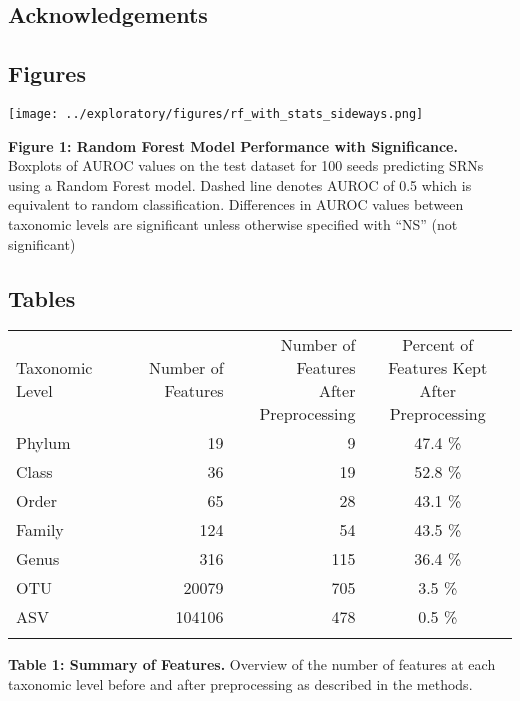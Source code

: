 \documentclass[
]{article}
\begin{document}
\hypertarget{acknowledgements}{%
\subsection{Acknowledgements}\label{acknowledgements}}

\newpage

\hypertarget{figures}{%
\subsection{Figures}\label{figures}}

\texttt{[image: ../exploratory/figures/rf\_with\_stats\_sideways.png]}

\textbf{Figure 1: Random Forest Model Performance with Significance.}
Boxplots of AUROC values on the test dataset for 100 seeds predicting
SRNs using a Random Forest model. Dashed line denotes AUROC of 0.5 which
is equivalent to random classification. Differences in AUROC values
between taxonomic levels are significant unless otherwise specified with
``NS'' (not significant)

\newpage

\hypertarget{tables}{%
\subsection{Tables}\label{tables}}

\begin{longtable}[]{@{}lrrc@{}}
\toprule
Taxonomic Level & Number of Features &
\makecell[c]{Number of Features \\ After Preprocessing} &
\makecell[c]{Percent of Features Kept \\ After Preprocessing} \\ \addlinespace
\midrule
\endhead
Phylum & 19 & 9 & 47.4 \% \\ \addlinespace
Class & 36 & 19 & 52.8 \% \\ \addlinespace
Order & 65 & 28 & 43.1 \% \\ \addlinespace
Family & 124 & 54 & 43.5 \% \\ \addlinespace
Genus & 316 & 115 & 36.4 \% \\ \addlinespace
OTU & 20079 & 705 & 3.5 \% \\ \addlinespace
ASV & 104106 & 478 & 0.5 \% \\ \addlinespace
\bottomrule
\end{longtable}

\textbf{Table 1: Summary of Features.} Overview of the number of
features at each taxonomic level before and after preprocessing as
described in the methods.
\end{document}
